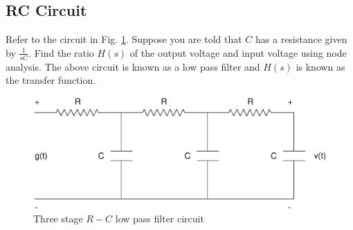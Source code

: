 
\subsection{RC Circuit}
%
\begin{problem}
Refer to the circuit in Fig. \ref{fig:2.1}. Suppose you are told that $C$ has a resistance given by $\frac{1}{s  C}$.   Find the ratio $H(s)$ of the output voltage and input voltage using node analysis.  The above circuit is known as a low pass filter and $H(s)$ is known as the transfer function.
\end{problem}
%
%
\begin{figure}[!h]
\centering
\includegraphics[width=\columnwidth]{./chapter2/figs/2.1.eps}
\caption{Three stage $R-C$ low pass filter circuit}
\label{fig:2.1}
\end{figure}
%


